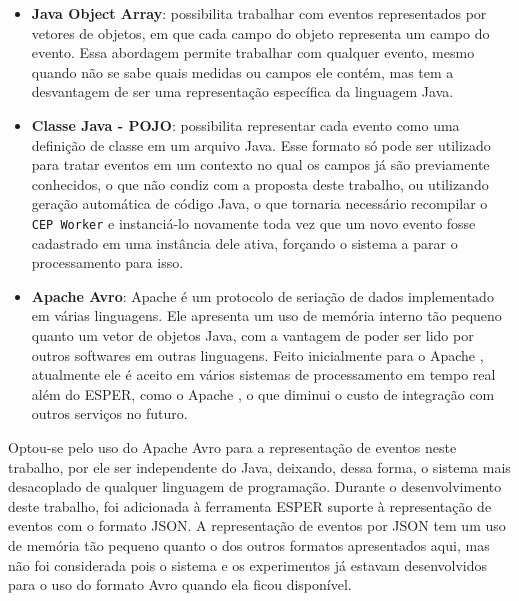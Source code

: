 \begin{itemize}
\item \textbf{Java Object Array}: possibilita trabalhar com eventos representados por vetores de objetos, em que cada campo do objeto representa um campo do evento. Essa abordagem permite trabalhar com qualquer evento, mesmo quando não se sabe quais medidas ou campos ele contém, mas tem a desvantagem de ser uma representação específica da linguagem Java.
\item \textbf{Classe Java - POJO}: possibilita representar cada evento como uma definição de classe em um arquivo Java. Esse formato só pode ser utilizado para tratar eventos em um contexto no qual os campos já são previamente conhecidos, o que não condiz com a proposta deste trabalho, ou utilizando geração automática de código Java, o que tornaria necessário recompilar o \texttt{CEP Worker} e instanciá-lo novamente toda vez que um novo evento fosse cadastrado em uma instância dele ativa, forçando o sistema a parar o processamento para isso.
\item \textbf{Apache Avro}: Apache \cite{Avro} é um protocolo de seriação de dados implementado em várias linguagens. Ele apresenta um uso de memória interno tão pequeno quanto um vetor de objetos Java, com a vantagem de poder ser lido por outros softwares em outras linguagens. Feito inicialmente para o Apache \cite{hadoop}, atualmente ele é aceito em vários sistemas de processamento em tempo real além do ESPER, como o Apache \cite{spark}, o que diminui o custo de integração com outros serviços no futuro.
\end{itemize}

Optou-se pelo uso do Apache Avro para a representação de eventos neste trabalho, por ele ser independente do Java, deixando, dessa forma,  o sistema mais desacoplado de qualquer linguagem de programação. 
Durante o desenvolvimento deste trabalho, foi adicionada à ferramenta ESPER suporte à representação de eventos com o formato JSON. A representação de eventos por JSON tem um uso de memória tão pequeno quanto o dos outros formatos apresentados aqui, mas não foi  considerada pois o sistema e os experimentos já estavam desenvolvidos para o uso do formato Avro quando ela ficou disponível. 

